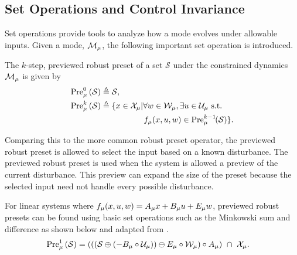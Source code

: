 \subsection{Set Operations and Control Invariance}
Set operations provide tools to analyze how a mode evolves under allowable inputs. Given a mode, $\mode{\modeidx}$, the following important set operation is introduced. 
\begin{definition}\label{def:prev_robust_preset}
The $k$-step, previewed robust preset of a set $\mathcal{S}$ under the constrained dynamics $\mode{\modeidx}$ is given by
\begin{align}
\PreviewedPre[\modeidx][0]{\mathcal{S}}&\triangleq\mathcal{S},\\
\PreviewedPre[\modeidx][k]{\mathcal{S}}&\triangleq\{x\in\xcon[\modeidx]|\forall w\in\wcon[\modeidx],\exists u\in\ucon[\modeidx]\text{ s.t. }\nonumber\\
&\hspace{1.85cm} f_\modeidx(x,u,w)\in\PreviewedPre[\modeidx][k-1]{\mathcal{S}}\}.
\end{align}
\end{definition}
Comparing this to the more common robust preset operator, the previewed robust preset is allowed to select the input based on a known disturbance. The previewed robust preset is used when the system is allowed a preview of the current disturbance. This preview can expand the size of the preset because the selected input need not handle every possible disturbance. 

For linear systems where $f_{\mu}(x,u,w) = A_{\mu} x + B_{\mu} u + E_{\mu} w$, previewed robust presets can be found using basic set operations such as the Minkowski sum and difference as shown below and adapted from \cite{Borrelli2017}.
\begin{align*}
\PreviewedPre[\modeidx][1]{\mathcal{S}} &= \left(\left(\left(\mathcal{S}\oplus\left(-B_\modeidx\circ\ucon[\modeidx]\right)\right)\ominus E_\modeidx\circ\wcon[\modeidx]\right)\circ A_\modeidx\right)\ \cap\ \xcon[\modeidx].
\end{align*}

